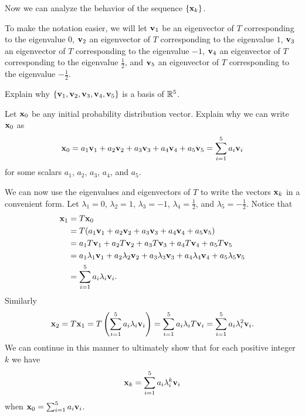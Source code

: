 Now we can analyze the behavior of the sequence $\{\mathbf{x}_k\}$.

\begin{pactivity} \label{act:Ehrenfest_basis} To make the notation easier, we will let $\mathbf{v}_1$ be an eigenvector of $T$ corresponding to the eigenvalue $0$, $\mathbf{v}_2$ an eigenvector of $T$ corresponding to the eigenvalue $1$, $\mathbf{v}_3$ an eigenvector of $T$ corresponding to the eigenvalue $-1$, $\mathbf{v}_4$ an eigenvector of $T$ corresponding to the eigenvalue $\frac{1}{2}$, and $\mathbf{v}_5$ an eigenvector of $T$ corresponding to the eigenvalue $-\frac{1}{2}$. 

	\ba
	
	\item Explain why $\{\mathbf{v}_1, \mathbf{v}_2, \mathbf{v}_3, \mathbf{v}_4, \mathbf{v}_5\}$ is a basis of $\mathbb{R}^5$.
    
	\item Let $\mathbf{x}_0$ be any initial probability distribution vector. Explain why we can write $\mathbf{x}_0$ as
\[\mathbf{x}_0 = a_1 \mathbf{v}_1 + a_2 \mathbf{v}_2 + a_3 \mathbf{v}_3 + a_4 \mathbf{v}_4 + a_5 \mathbf{v}_5 = \sum_{i=1}^5 a_i \mathbf{v}_i\]
for some scalars $a_1$, $a_2$, $a_3$, $a_4$, and $a_5$.

\ea

\end{pactivity}


We can now use the eigenvalues and eigenvectors of $T$ to write the vectors $\mathbf{x}_k$ in a convenient form. Let $\lambda_1 = 0$, $\lambda_2=1$, $\lambda_3=-1$, $\lambda_4=\frac{1}{2}$, and $\lambda_5=-\frac{1}{2}$. Notice that 
\begin{align*}
\mathbf{x}_1 &= T \mathbf{x}_0  \\
	&= T(a_1  \mathbf{v}_1 + a_2 \mathbf{v}_2 + a_3  \mathbf{v}_3 + a_4  \mathbf{v}_4 + a_5 \mathbf{v}_5) \\
	&= a_1  T\mathbf{v}_1 + a_2 T\mathbf{v}_2 + a_3  T\mathbf{v}_3 + a_4 T\mathbf{v}_4 + a_5 T\mathbf{v}_5 \\
	&= a_1\lambda_1 \mathbf{v}_1 + a_2\lambda_2 \mathbf{v}_2 + a_3 \lambda_3 \mathbf{v}_3 + a_4 \lambda_4 \mathbf{v}_4 + a_5 \lambda_5 \mathbf{v}_5 \\
	&= \sum_{i=1}^5 a_i \lambda_i \mathbf{v}_i.
\end{align*}
Similarly
\[\mathbf{x}_2 = T \mathbf{x}_1 = T\left(\sum_{i=1}^5 a_i \lambda_i\mathbf{v}_i\right) = \sum_{i=1}^5 a_i \lambda_i T\mathbf{v}_i = \sum_{i=1}^5 a_i\lambda_i^2 \mathbf{v}_i.\]
We can continue in this manner to ultimately show that for each positive integer $k$ we have 
\begin{equation} \label{eq:Ehrenfest_sum}
\mathbf{x}_k = \sum_{i=1}^5 a_i\lambda_i^k \mathbf{v}_i
\end{equation}
when $\mathbf{x}_0 = \sum_{i=1}^5 a_i \mathbf{v}_i$. 


